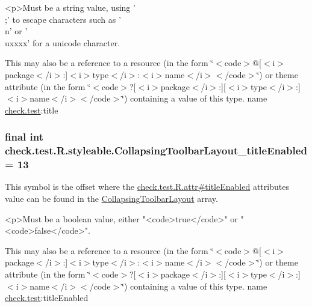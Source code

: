 \begin{DoxyVerb}      <p>Must be a string value, using '\\;' to escape characters such as '\\n' or '\\uxxxx' for a unicode character.
\end{DoxyVerb}
 

This may also be a reference to a resource (in the form \char`\"{}$<$code$>$@\mbox{[}$<$i$>$package$<$/i$>$\+:\mbox{]}$<$i$>$type$<$/i$>$\+:$<$i$>$name$<$/i$>$$<$/code$>$\char`\"{}) or theme attribute (in the form \char`\"{}$<$code$>$?\mbox{[}$<$i$>$package$<$/i$>$\+:\mbox{]}\mbox{[}$<$i$>$type$<$/i$>$\+:\mbox{]}$<$i$>$name$<$/i$>$$<$/code$>$\char`\"{}) containing a value of this type.  name \hyperlink{namespacecheck_1_1test}{check.\+test}\+:title \hypertarget{classcheck_1_1test_1_1_r_1_1styleable_ab762976306f550b00c8cb1c7ed31cd44}{}
\subsubsection[{Collapsing\+Toolbar\+Layout\+\_\+title\+Enabled}]{\setlength{\rightskip}{0pt plus 5cm}final int check.\+test.\+R.\+styleable.\+Collapsing\+Toolbar\+Layout\+\_\+title\+Enabled = 13\hspace{0.3cm}{\ttfamily [static]}}\label{classcheck_1_1test_1_1_r_1_1styleable_ab762976306f550b00c8cb1c7ed31cd44}
This symbol is the offset where the \hyperlink{classcheck_1_1test_1_1_r_1_1attr_aee85e0b8f8875713f0f0ae34e9641d08}{check.\+test.\+R.\+attr\#title\+Enabled} attribute\textquotesingle{}s value can be found in the \hyperlink{classcheck_1_1test_1_1_r_1_1styleable_a0c512120c75d0ddac20063034a72db17}{Collapsing\+Toolbar\+Layout} array.

\begin{DoxyVerb}      <p>Must be a boolean value, either "<code>true</code>" or "<code>false</code>".
\end{DoxyVerb}
 

This may also be a reference to a resource (in the form \char`\"{}$<$code$>$@\mbox{[}$<$i$>$package$<$/i$>$\+:\mbox{]}$<$i$>$type$<$/i$>$\+:$<$i$>$name$<$/i$>$$<$/code$>$\char`\"{}) or theme attribute (in the form \char`\"{}$<$code$>$?\mbox{[}$<$i$>$package$<$/i$>$\+:\mbox{]}\mbox{[}$<$i$>$type$<$/i$>$\+:\mbox{]}$<$i$>$name$<$/i$>$$<$/code$>$\char`\"{}) containing a value of this type.  name \hyperlink{namespacecheck_1_1test}{check.\+test}\+:title\+Enabled \hypertarget{classcheck_1_1test_1_1_r_1_1styleable_ab00225a14bdf82c12e0532781e9bb655}{}
